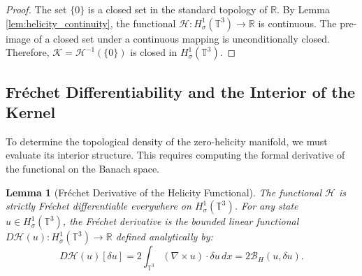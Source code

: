 \documentclass[12pt,a4paper]{article}
\theoremstyle{plain}
\newtheorem{lemma}[theorem]{Lemma}
\theoremstyle{definition}
\theoremstyle{remark}
\newcommand{\T}{\mathbb{T}}
\newcommand{\R}{\mathbb{R}}
\begin{document}
\begin{proof}
The set $\{0\}$ is a closed set in the standard topology of $\R$. By Lemma \ref{lem:helicity_continuity}, the functional $\mathcal{H} : H^1_\sigma(\T^3) \to \R$ is continuous. The pre-image of a closed set under a continuous mapping is unconditionally closed. Therefore, $\mathcal{K} = \mathcal{H}^{-1}(\{0\})$ is closed in $H^1_\sigma(\T^3)$.
\end{proof}

\subsection{Fréchet Differentiability and the Interior of the Kernel}

To determine the topological density of the zero-helicity manifold, we must evaluate its interior structure. This requires computing the formal derivative of the functional on the Banach space.

\begin{lemma}[Fréchet Derivative of the Helicity Functional]
\label{lem:frechet_derivative}
The functional $\mathcal{H}$ is strictly Fréchet differentiable everywhere on $H^1_\sigma(\T^3)$. For any state $u \in H^1_\sigma(\T^3)$, the Fréchet derivative is the bounded linear functional $D\mathcal{H}(u) : H^1_\sigma(\T^3) \to \R$ defined analytically by:
\[
  D\mathcal{H}(u)[\delta u] = 2 \int_{\T^3} (\nabla \times u) \cdot \delta u \,dx = 2 \mathcal{B}_H(u, \delta u).
\]
\end{lemma}
\end{document}
